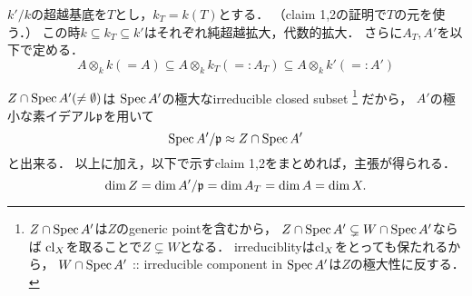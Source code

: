 \documentclass[a4paper]{jsarticle}
\begin{document}
    $k'/k$の超越基底を$T$とし，$k_T=k(T)$とする．
    （claim 1,2の証明で$T$の元を使う．）
    この時$k \subseteq k_T \subseteq k'$はそれぞれ純超越拡大，代数的拡大．
    さらに$A_T, A'$を以下で定める．
    \[ A \otimes_k k(=A) \subseteq A \otimes_k k_T(=:A_T) \subseteq A \otimes_k k'(=:A') \]

    $Z \cap \operatorname{Spec} A'(\neq \emptyset)$は
    $\operatorname{Spec} A'$の極大なirreducible closed subset
    \footnote
    {
        $Z \cap \operatorname{Spec} A'$は$Z$のgeneric pointを含むから，
        $Z \cap \operatorname{Spec} A' \subsetneq W \cap \operatorname{Spec} A'$ならば
        $\operatorname{cl}_X$を取ることで$Z \subsetneq W$となる．
        irreduciblityは$\operatorname{cl}_X$をとっても保たれるから，
        $W \cap \operatorname{Spec} A'$ :: irreducible component in $\operatorname{Spec} A'$は$Z$の極大性に反する．
    }
    だから，
    $A'$の極小な素イデアル$\mathfrak{p}$を用いて
    \[ \operatorname{Spec} A'/\mathfrak{p} \approx Z \cap \operatorname{Spec} A' \]と出来る．
    以上に加え，以下で示すclaim 1,2をまとめれば，主張が得られる．
    \[ \dim Z=\dim A'/\mathfrak{p}=\dim A_T=\dim A=\dim X. \]
\end{document}
